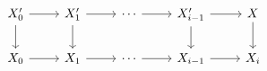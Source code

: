\documentclass[12pt]{standalone}
\begin{document}
        $$

\begin{tikzcd}
X^\prime_0 \ar[r] \ar[d] & X^\prime_1 \ar[r] \ar[d] & \cdots \ar[r] & X_{i-1}^\prime \ar[r] \ar[d] & X \ar[d] \\
X_0 \ar[r] & X_1 \ar[r] & \cdots \ar[r] & X_{i-1} \ar[r] & X_i
\end{tikzcd}
        $$
        
\end{document}
